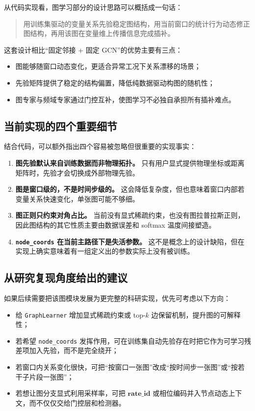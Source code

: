 \documentclass[UTF8]{ctexart}
\begin{document}
从代码实现看，图学习部分的设计思路可以概括成一句话：
\begin{quote}
    用训练集驱动的变量关系先验稳定图结构，用当前窗口的统计行为动态修正图结构，再用该图在变量维上传播信息完成插补。
\end{quote}

这套设计相比“固定邻接 + 固定 GCN”的优势主要有三点：
\begin{itemize}
    \item 图能够随窗口动态变化，更适合异常工况下关系漂移的场景；
    \item 先验矩阵提供了稳定的结构偏置，降低纯数据驱动构图的随机性；
    \item 图专家与频域专家通过门控互补，使图学习不必独自承担所有插补难点。
\end{itemize}

\subsection{当前实现的四个重要细节}

结合代码，可以额外指出四个容易被忽略但很重要的实现事实：
\begin{enumerate}
    \item \textbf{图先验默认来自训练数据而非物理拓扑。} 只有用户显式提供物理坐标或距离矩阵时，先验才会切换成外部物理先验。
    \item \textbf{图是窗口级的，不是时间步级的。} 这会降低复杂度，但也意味着窗口内部若变量关系快速变化，单张图可能不够细。
    \item \textbf{图正则只约束对角占比。} 当前没有显式稀疏约束，也没有图拉普拉斯正则，因此图结构的其它性质主要由数据误差和 softmax 温度间接塑造。
    \item \textbf{\texttt{node\_coords} 在当前主路径下是失活参数。} 这不是概念上的设计缺陷，但在实现上确实意味着有一组定义出的参数实际上没有被训练。
\end{enumerate}

\subsection{从研究复现角度给出的建议}

如果后续需要把该图模块发展为更完整的科研实现，优先可考虑以下方向：
\begin{itemize}
    \item 给 \texttt{GraphLearner} 增加显式稀疏约束或 top-\(k\) 边保留机制，提升图的可解释性；
    \item 若希望 \texttt{node\_coords} 发挥作用，可在训练集自动先验存在时把它作为可学习残差项加入先验，而不是完全绕开；
    \item 若窗口内关系变化很快，可把“按窗口一张图”改成“按时间步一张图”或“按若干子片段一张图”；
    \item 若想让图分支显式利用采样率，可把 \(\bm{rate\_id}\) 或相位编码并入节点动态上下文，而不仅仅交给门控层和检测器。
\end{itemize}
\end{document}
